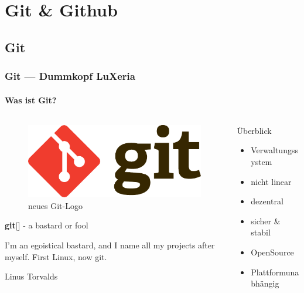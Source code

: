 \section{Git \& Github}
\begin{frame}
	\frametitle{}
	\tableofcontents[currentsection]
\end{frame}

\subsection{Git}
\begin{frame}
	\frametitle{Git --- Dummkopf \hfill{} LuXeria}
	\framesubtitle{Was ist Git?}
	\begin{columns}
		\begin{column}{5cm}
			\begin{figure}
				\includegraphics[width=0.8\columnwidth]{git_logo.pdf}
				\caption{neues Git-Logo}
			\end{figure}
			\footnotesize{
			\textbf{git}[] - a bastard or fool
			\epigraph{ I'm an egoistical bastard, and I name all my projects after myself.
				First Linux, now git.}{Linus Torvalds}
			}\normalsize
		\end{column}
		\begin{column}{5cm}
			\begin{block}{Überblick}
				\begin{itemize}
					\item Verwaltungssystem
					\item nicht linear
					\item dezentral
					\item sicher \& stabil
					\item OpenSource
					\item Plattformunabhängig
				\end{itemize}
			\end{block}
		\end{column}
	\end{columns}
\end{frame}

